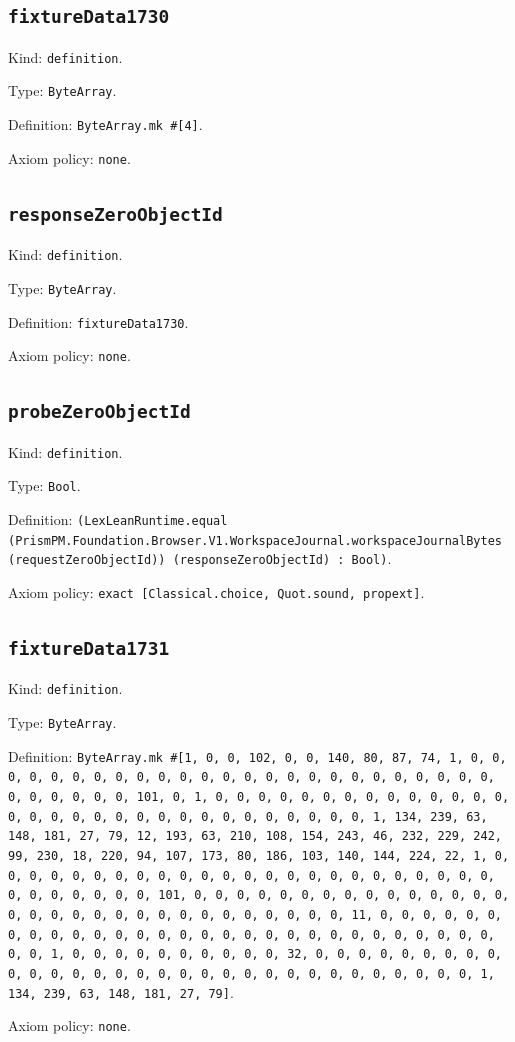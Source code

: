 \documentclass[11pt]{article}
\begin{document}
\subsection*{\texttt{fixtureData1730}}
\noindent Kind: \texttt{definition}.\par
\noindent Type: \texttt{ByteArray}.\par
\noindent Definition: \texttt{ByteArray.mk \#[4]}.\par
\noindent Axiom policy: \texttt{none}.\par
\subsection*{\texttt{responseZeroObjectId}}
\noindent Kind: \texttt{definition}.\par
\noindent Type: \texttt{ByteArray}.\par
\noindent Definition: \texttt{fixtureData1730}.\par
\noindent Axiom policy: \texttt{none}.\par
\subsection*{\texttt{probeZeroObjectId}}
\noindent Kind: \texttt{definition}.\par
\noindent Type: \texttt{Bool}.\par
\noindent Definition: \texttt{(LexLeanRuntime.equal (PrismPM.Foundation.Browser.V1.WorkspaceJournal.workspaceJournalBytes (requestZeroObjectId)) (responseZeroObjectId) : Bool)}.\par
\noindent Axiom policy: \texttt{exact [Classical.choice, Quot.sound, propext]}.\par
\subsection*{\texttt{fixtureData1731}}
\noindent Kind: \texttt{definition}.\par
\noindent Type: \texttt{ByteArray}.\par
\noindent Definition: \texttt{ByteArray.mk \#[1, 0, 0, 102, 0, 0, 140, 80, 87, 74, 1, 0, 0, 0, 0, 0, 0, 0, 0, 0, 0, 0, 0, 0, 0, 0, 0, 0, 0, 0, 0, 0, 0, 0, 0, 0, 0, 0, 0, 0, 0, 0, 101, 0, 1, 0, 0, 0, 0, 0, 0, 0, 0, 0, 0, 0, 0, 0, 0, 0, 0, 0, 0, 0, 0, 0, 0, 0, 0, 0, 0, 0, 0, 0, 0, 0, 1, 134, 239, 63, 148, 181, 27, 79, 12, 193, 63, 210, 108, 154, 243, 46, 232, 229, 242, 99, 230, 18, 220, 94, 107, 173, 80, 186, 103, 140, 144, 224, 22, 1, 0, 0, 0, 0, 0, 0, 0, 0, 0, 0, 0, 0, 0, 0, 0, 0, 0, 0, 0, 0, 0, 0, 0, 0, 0, 0, 0, 0, 0, 0, 0, 101, 0, 0, 0, 0, 0, 0, 0, 0, 0, 0, 0, 0, 0, 0, 0, 0, 0, 0, 0, 0, 0, 0, 0, 0, 0, 0, 0, 0, 0, 0, 0, 11, 0, 0, 0, 0, 0, 0, 0, 0, 0, 0, 0, 0, 0, 0, 0, 0, 0, 0, 0, 0, 0, 0, 0, 0, 0, 0, 0, 0, 0, 0, 0, 1, 0, 0, 0, 0, 0, 0, 0, 0, 0, 0, 32, 0, 0, 0, 0, 0, 0, 0, 0, 0, 0, 0, 0, 0, 0, 0, 0, 0, 0, 0, 0, 0, 0, 0, 0, 0, 0, 0, 0, 0, 0, 0, 1, 134, 239, 63, 148, 181, 27, 79]}.\par
\noindent Axiom policy: \texttt{none}.\par
\end{document}
